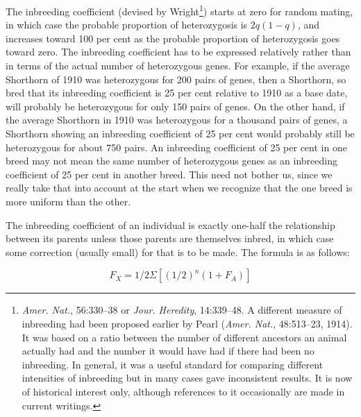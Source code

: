 The inbreeding coefficient (devised by Wright\footnote{\textit{Amer. Nat.},
56:330--38 or \textit{Jour. Heredity}, 14:339--48. A different measure of
inbreeding had been proposed earlier by Pearl (\textit{Amer. Nat.},
48:513--23, 1914). It was based on a ratio between the number of different
ancestors an animal actually had and the number it would have had if there
had been no inbreeding. In general, it was a useful standard for comparing
different intensities of inbreeding but in many cases gave inconsistent
results. It is now of historical interest only, although references
to it occasionally are made in current writings.}) starts at zero for
random mating, in which case the probable proportion of heterozygosis
is $2q (1 - q)$, and increases toward 100 per cent as the probable proportion
of heterozygosis goes toward zero. The inbreeding coefficient has
to be expressed relatively rather than in terms of the actual number of
heterozygous genes. For example, if the average Shorthorn of 1910 was
heterozygous for 200 pairs of genes, then a Shorthorn, so bred that its
inbreeding coefficient is 25 per cent relative to 1910 as a base date, will
probably be heterozygous for only 150 pairs of genes. On the other
hand, if the average Shorthorn in 1910 was heterozygous for a thousand
pairs of genes, a Shorthorn showing an inbreeding coefficient of 25 per
cent would probably still be heterozygous for about 750 pairs. An
inbreeding coefficient of 25 per cent in one breed may not mean the
same number of heterozygous genes as an inbreeding coefficient of 25
per cent in another breed. This need not bother us, since we really
take that into account at the start when we recognize that the one breed
is more uniform than the other.

The inbreeding coefficient of an individual is exactly one-half the
relationship between its parents unless those parents are themselves
inbred, in which case some correction (usually small) for that is to be
made. The formula is as follows:

\[ F_X = 1/2 \Sigma [(1/2)^n(1 + F_A)] \]

